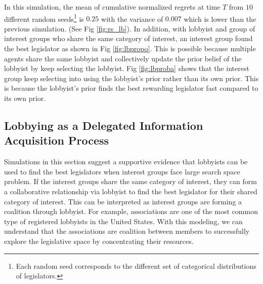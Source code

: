 \documentclass{article}
\begin{document}
In this simulation, the mean of cumulative normalized regrets at time $T$ from 
$10$ different random seeds\footnote{Each random seed  
corresponds to the different set of categorical distributions of legislators. 
} is $0.25$ with the variance of $0.007$ which is lower than the previous simulation. 
(See Fig \ref{fig:rs_lb}).
In addition, with lobbyist and group of 
interest groups who share the same category of interest,
an interest group found the best legislator as shown in Fig \ref{fig:lbpropo}.  
This is possible because multiple agents 
share the same lobbyist and collectively update 
the prior belief of the lobbyist
by keep selecting the lobbyist. Fig \ref{fig:lbproba} 
shows that the interest group keep selecting into using 
the lobbyist's prior rather than its own prior. 
This is because
the lobbyist's prior 
finds the best rewarding legislator fast compared to its own prior.

\subsection{Lobbying as a Delegated Information Acquisition Process}

Simulations in this section 
suggest a supportive evidence that 
lobbyists can be used to find the best legislators
when interest groups face large search space problem.
If the interest groups share the 
same category of interest, they can form a collaborative
relationship via lobbyist 
to find the best legislator for their shared category of interest.
This can be interpreted as 
interest groups are 
forming a coalition through lobbyist.
For example, associations are one of the most 
common type of registered 
lobbyists in the United States. 
With this modeling, we can understand that the 
associations are coalition between members
to successfully explore the legislative space 
by concentrating their resources.
\end{document}
